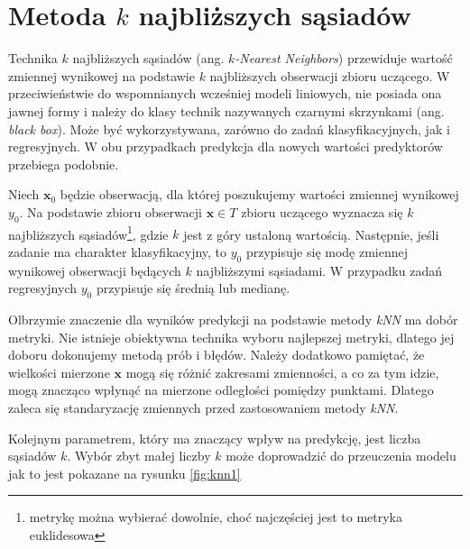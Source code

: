 \documentclass[
]{book}
\theoremstyle{plain}
\theoremstyle{definition}
\theoremstyle{definition}
\theoremstyle{definition}
\theoremstyle{definition}
\theoremstyle{definition}
\theoremstyle{remark}
\begin{document}
\chapter{\texorpdfstring{Metoda \(k\) najbliższych sąsiadów}{Metoda k najbliższych sąsiadów}}\label{metoda-k-najbliux17cszych-sux105siaduxf3w}

Technika \(k\) najbliższych sąsiadów (ang. \emph{\(k\)-Nearest Neighbors}) przewiduje wartość zmiennej wynikowej na podstawie \(k\) najbliższych obserwacji zbioru uczącego. W przeciwieństwie do wspomnianych wcześniej modeli liniowych, nie posiada ona jawnej formy i należy do klasy technik nazywanych czarnymi skrzynkami (ang. \emph{black box}). Może być wykorzystywana, zarówno do zadań klasyfikacyjnych, jak i regresyjnych. W obu przypadkach predykcja dla nowych wartości predyktorów przebiega podobnie.

Niech \(\boldsymbol x_0\) będzie obserwacją, dla której poszukujemy wartości zmiennej wynikowej \(y_0\). Na podstawie zbioru obserwacji \(\boldsymbol x\in T\) zbioru uczącego wyznacza się \(k\) najbliższych sąsiadów\footnote{metrykę można wybierać dowolnie, choć najczęściej jest to metryka euklidesowa}, gdzie \(k\) jest z góry ustaloną wartością. Następnie, jeśli zadanie ma charakter klasyfikacyjny, to \(y_0\) przypisuje się modę zmiennej wynikowej obserwacji będących \(k\) najbliższymi sąsiadami. W przypadku zadań regresyjnych \(y_0\) przypisuje się średnią lub medianę.

Olbrzymie znaczenie dla wyników predykcji na podstawie metody \emph{kNN} ma dobór metryki. Nie istnieje obiektywna technika wyboru najlepszej metryki, dlatego jej doboru dokonujemy metodą prób i błędów. Należy dodatkowo pamiętać, że wielkości mierzone \(\boldsymbol x\) mogą się różnić zakresami zmienności, a co za tym idzie, mogą znacząco wpłynąć na mierzone odległości pomiędzy punktami. Dlatego zaleca się standaryzację zmiennych przed zastosowaniem metody \emph{kNN}.

Kolejnym parametrem, który ma znaczący wpływ na predykcję, jest liczba sąsiadów \(k\). Wybór zbyt małej liczby \(k\) może doprowadzić do przeuczenia modelu jak to jest pokazane na rysunku \ref{fig:knn1}
\end{document}
